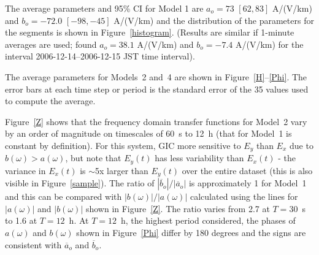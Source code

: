 \documentclass[draft,linenumbers]{agujournal2018}
\begin{document}
The average parameters and 95\% CI for Model 1 are $a_o = 73$ $[62,83]$ A/(V/km) and $b_o = -72.0$ $[-98,-45]$ A/(V/km) and the distribution of the parameters for the segments is shown in Figure~\ref{histogram}. (Results are similar if 1-minute averages are used; \cite{Watari2015} found $a_o=38.1$ A/(V/km) and $b_o=-7.4$ A/(V/km) for the interval 2006-12-14--2006-12-15 JST time interval). 
 

The average parameters for Models~2 and~4 are shown in Figure~\ref{H}--\ref{Phi}. The error bars at each time step or period is the standard error of the 35 values used to compute the average.


Figure~\ref{Z} shows that the frequency domain transfer functions for Model~2 vary by an order of magnitude on timescales of 60~s to 12~h (that for Model~1 is constant by definition). For this system, GIC more sensitive to $E_y$ than $E_x$ due to $b(\omega) > a(\omega)$, but note that $E_y(t)$ has less variability than $E_x(t)$ - the variance in $E_x(t)$ is $\sim$5x larger than $E_y(t)$ over the entire dataset (this is also visible in Figure~\ref{sample}). The ratio of $|\overline{b}_o|/|\overline{a}_o|$ is approximately 1 for Model~1 and this can be compared with $|b(\omega)|/|a(\omega)|$ calculated using the lines for $|a(\omega)|$ and $|b(\omega)|$ shown in Figure~\ref{Z}. The ratio varies from 2.7 at $T=30$~s to 1.6 at $T=12$~h. At $T=12$~h, the highest period considered, the phases of $a(\omega)$ and $b(\omega)$ shown in Figure~\ref{Phi} differ by 180 degrees and the signs are consistent with $\overline{a}_o$ and $\overline{b}_o$. 
\end{document}
